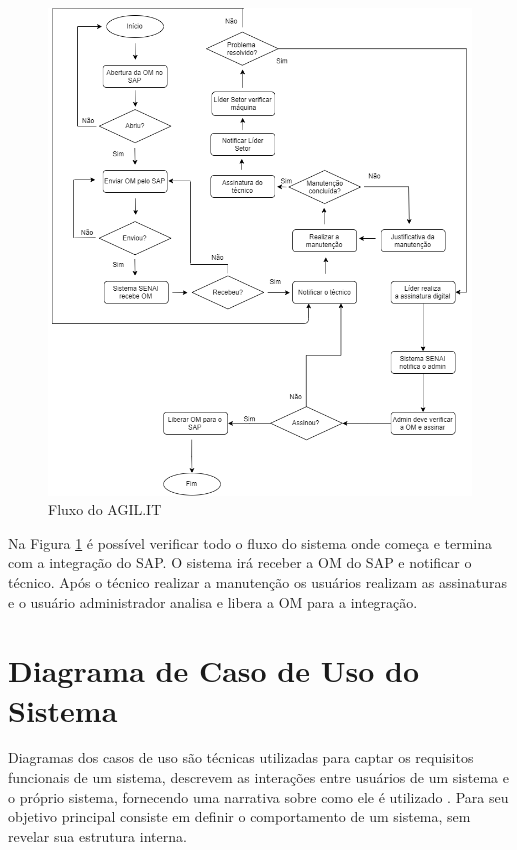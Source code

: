 {{\newpage
\begin{figure}[htb]
	\caption{\label{flux_sys}Fluxo do AGIL.IT}
	\begin{center}
		\includegraphics[scale=0.55]{./Figuras/fluxo-sistema.png}
	\end{center}
\end{figure}

Na Figura \ref{flux_sys} é possível verificar todo o fluxo do sistema onde começa e termina com a integração do SAP.
O sistema irá receber a OM do SAP e notificar o técnico. Após o técnico realizar a manutenção os usuários realizam as assinaturas e o usuário administrador analisa e libera a OM para a integração.


\section{Diagrama de Caso de Uso do Sistema }

{Diagramas dos casos de uso são técnicas utilizadas para captar os requisitos funcionais de um sistema, descrevem as interações entre usuários de um sistema e o próprio sistema, fornecendo uma narrativa sobre como ele é utilizado \cite{umlessencial2005}. Para \cite{carniello2003} seu objetivo principal consiste em definir o comportamento de um sistema, sem revelar sua estrutura interna.}

}}
